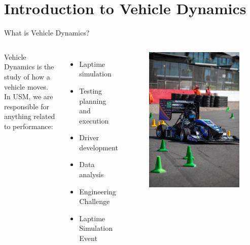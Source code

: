 \section*{Introduction to Vehicle Dynamics}

\begin{frame}{What is Vehicle Dynamics?}
    \begin{columns}
        Vehicle Dynamics is the study of how a vehicle moves. \\
        \vspace*{2ex}
        In USM, we are responsible for anything related to performance:
        \begin{itemize}
            \item Laptime simulation
            \item Testing planning and execution
            \item Driver development
            \item Data analysis
            \item Engineering Challenge
            \item Laptime Simulation Event
        \end{itemize}
        \begin{figure}
            \includegraphics[width=\textwidth]{../../res/car/FSUK Cornering.jpg}

\end{figure}
\end{columns}
\end{frame}
